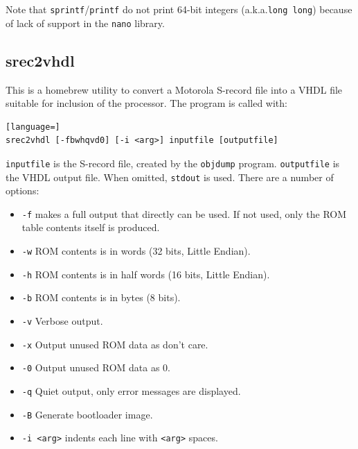 \documentclass[12pt]{article}
\begin{document}
Note that \lstinline|sprintf|/\lstinline|printf| do not print 64-bit integers (a.k.a.\@ \lstinline|long long|) because of lack of support in the \lstinline|nano| library.

\subsection{srec2vhdl}
This is a homebrew utility to convert a Motorola S-record file into a VHDL file suitable for inclusion of the processor. The program is called with:

\begin{lstlisting}[language=]
srec2vhdl [-fbwhqvd0] [-i <arg>] inputfile [outputfile]
\end{lstlisting}

\lstinline|inputfile| is the S-record file, created by the \lstinline|objdump| program. \lstinline|outputfile| is the VHDL output file. When omitted, \lstinline|stdout| is used. There are a number of options:

\begin{itemize}
\item \lstinline|-f| makes a full output that directly can be used. If not used, only the ROM table contents itself is produced.
\item \lstinline|-w| ROM contents is in words (32 bits, Little Endian).
\item \lstinline|-h| ROM contents is in half words (16 bits, Little Endian).
\item \lstinline|-b| ROM contents is in bytes (8 bits).
\item \lstinline|-v| Verbose output.
\item \lstinline|-x| Output unused ROM data as don't care.
\item \lstinline|-0| Output unused ROM data as 0.
\item \lstinline|-q| Quiet output, only error messages are displayed.
\item \lstinline|-B| Generate bootloader image.
\item \lstinline|-i <arg>| indents each line with \lstinline|<arg>| spaces.
\end{itemize}
\end{document}
